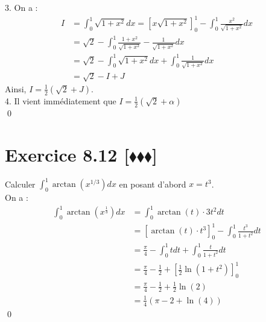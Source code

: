 \documentclass[10pt]{article}
\begin{document}
\begin{tcolorbox}[enhanced, width=7in, center, size=fbox, fontupper=\large, drop shadow southwest]
\begin{equation*}
    \end{equation*}
    3. On a :
    \begin{align*}
        I &= \int_0^1{\sqrt{1+x^2}dx}=\left[x\sqrt{1+x^2}\right]_0^1 - \int_0^1{\frac{x^2}{\sqrt{1+x^2}}dx}\\
        &= \sqrt{2} - \int_0^1{\frac{1+x^2}{\sqrt{1+x^2}}-\frac{1}{\sqrt{1+x^2}}dx}\\
        &=\sqrt{2} - \int_0^1{\sqrt{1+x^2}dx} + \int_0^1{\frac{1}{\sqrt{1+x^2}}dx}\\
        &=\sqrt{2} - I + J
    \end{align*}
    Ainsi, $I = \frac{1}{2}\left(\sqrt{2} + J\right)$.\\
    4. Il vient immédiatement que $I=\frac{1}{2}\left(\sqrt{2}+\alpha\right)$\\
    \qed
\end{tcolorbox}


\section*{Exercice 8.12 [$\blacklozenge\blacklozenge\blacklozenge$]}
\begin{tcolorbox}[enhanced, width=7in, center, size=fbox, fontupper=\large, drop shadow southwest]
    Calculer $\int_0^1{\arctan(x^{1/3})dx}$ en posant d'abord $x=t^3$.\\
    On a :
    \begin{align*}
        \int_0^1{\arctan(x^{\frac{1}{3}})dx}&=\int_0^1{\arctan(t)\cdot3t^2dt}\\
        &=\left[\arctan(t)\cdot t^3\right]_0^1 - \int_0^1{\frac{t^3}{1+t^2} dt}\\
        &=\frac{\pi}{4} - \int_0^1{tdt}+\int_0^1{\frac{t}{1+t^2}dt}\\
        &=\frac{\pi}{4} - \frac{1}{2} + \left[\frac{1}{2}\ln(1+t^2)\right]_0^1\\
        &=\frac{\pi}{4} - \frac{1}{2} + \frac{1}{2}\ln(2)\\
        &=\frac{1}{4}\left(\pi - 2 + \ln(4)\right)
    \end{align*}
    \qed
\end{tcolorbox}

\end{document}
